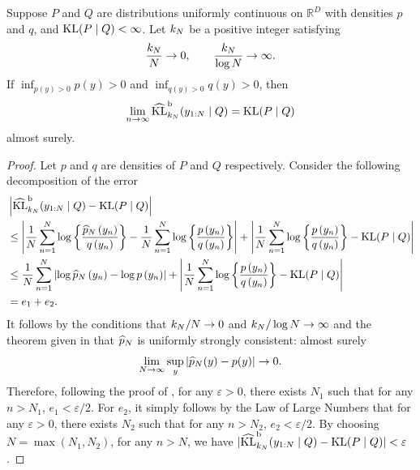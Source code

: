 \begin{proposition} \label{prop:one-sample-klest}
	Suppose $P$ and $Q$ are distributions uniformly continuous on $\mathbb{R}^D$ with densities $p$ and $q$,
	and $\mathrm{KL}(P \mid Q) < \infty$. Let $k_{N}$ be a positive integer satisfying
	\[
		\frac{k_{N}}{N} \rightarrow 0, \qquad \frac{k_{N}}{\log N} \rightarrow \infty.
	\]
	If $\inf_{p(y)>0} p(y)>0$ and $\inf_{q(y)>0} q(y)>0$, then
	\begin{equation}
		\lim\limits_{n\rightarrow\infty}\klestsub{b}{k_{\numobs}}{y_{1:\numobs}}{Q} = \kl{P}{Q}
	\end{equation}
	almost surely.
\end{proposition}
\begin{proof}
	Let $p$ and $q$ are densities of $P$ and $Q$ respectively.
	Consider the following decomposition of the error
	\begin{equation}
		\begin{aligned}
			 & \left|\klestsub{b}{k_{\numobs}}{y_{1:\numobs}}{Q} -\kl{P}{Q} \right|                                                                                                                                                                                                                                                                                                          \\
			 & \leq\left|\frac{1}{\numobs} \sum_{n=1}^{\numobs} \log\left\{\frac{\widehat{p}_{\numobs}\left(y_n\right)}{q\left(y_n\right)}\right\} -\frac{1}{\numobs} \sum_{n=1}^{\numobs} \log\left\{\frac{p\left(y_n\right)}{q\left(y_n\right)}\right\} \right| +\left|\frac{1}{\numobs} \sum_{n=1}^{\numobs} \log\left\{\frac{p\left(y_n\right)}{q\left(y_n\right)}\right\} -\kl{P}{Q}\right| \\
			 & \leq \frac{1}{\numobs} \sum_{n=1}^{\numobs}\left|\log \widehat{p}_{\numobs}\left(y_n\right)-\log p\left(y_n\right)\right|  +\left|\frac{1}{\numobs} \sum_{n=1}^{\numobs} \log\left\{\frac{p\left(y_n\right)}{q\left(y_n\right)}\right\} -\kl{P}{Q}\right|                                                                                                                         \\ &= e_1+e_2 .\end{aligned}
	\end{equation}
	It follows by the conditions that $k_{N}/N \rightarrow 0$ and $k_{N}/\log N \rightarrow \infty$ 	and the theorem given in \cite{Devroye:1977} that $\widehat{p}_{N}$ is uniformly strongly consistent: almost surely
	\begin{equation}
		\lim _{\numobs \rightarrow \infty} \sup _y\left|\widehat{p}_{\numobs}(y)-p(y)\right| \rightarrow 0.
	\end{equation}
	Therefore, following the proof of \cite{Wang:2009}, for any $\varepsilon > 0$, there exists $N_1$ such that for any $n > N_1$, $e_1 < \varepsilon/2$. For $e_2$, it simply follows by the Law of Large Numbers that for any $\varepsilon > 0$, there exists $N_2 $ such that for any $n > N_2$, $e_2 < \varepsilon/2$. By choosing $N = \max(N_1, N_2)$, for any $n>N$, we have $|\mathrm{\widehat{KL}^{b}}_{k_{N}}(y_{1:N} \mid Q) -\mathrm{KL}(P \mid Q) | < \varepsilon$.
\end{proof}

